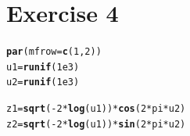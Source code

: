 \documentclass{article}\usepackage[]{graphicx}\usepackage[]{color}
\makeatletter
\newcommand{\hlnum}[1]{\textcolor[rgb]{0.686,0.059,0.569}{#1}}%
\newcommand{\hlopt}[1]{\textcolor[rgb]{0,0,0}{#1}}%
\newcommand{\hlstd}[1]{\textcolor[rgb]{0.345,0.345,0.345}{#1}}%
\newcommand{\hlkwb}[1]{\textcolor[rgb]{0.69,0.353,0.396}{#1}}%
\newcommand{\hlkwc}[1]{\textcolor[rgb]{0.333,0.667,0.333}{#1}}%
\newcommand{\hlkwd}[1]{\textcolor[rgb]{0.737,0.353,0.396}{\textbf{#1}}}%
\newenvironment{kframe}{%
 \def\at@end@of@kframe{}%
 \ifinner\ifhmode%
  \def\at@end@of@kframe{\end{minipage}}%
  \begin{minipage}{\columnwidth}%
 \fi\fi%
 \def\FrameCommand##1{\hskip\@totalleftmargin \hskip-\fboxsep
 \colorbox{shadecolor}{##1}\hskip-\fboxsep
     \hskip-\linewidth \hskip-\@totalleftmargin \hskip\columnwidth}%
 \MakeFramed {\advance\hsize-\width
   \@totalleftmargin\z@ \linewidth\hsize
   \@setminipage}}%
 {\par\unskip\endMakeFramed%
 \at@end@of@kframe}
\newenvironment{knitrout}{}{} %
\makeatother
\begin{document}
\section*{Exercise 4}
\begin{knitrout}
\color{fgcolor}\begin{kframe}
\begin{alltt}
\hlkwd{par}\hlstd{(}\hlkwc{mfrow}\hlstd{=}\hlkwd{c}\hlstd{(}\hlnum{1}\hlstd{,}\hlnum{2}\hlstd{))}
\hlstd{u1} \hlkwb{=} \hlkwd{runif}\hlstd{(}\hlnum{1e3}\hlstd{)}
\hlstd{u2} \hlkwb{=} \hlkwd{runif}\hlstd{(}\hlnum{1e3}\hlstd{)}

\hlstd{z1} \hlkwb{=} \hlkwd{sqrt}\hlstd{(}\hlopt{-}\hlnum{2}\hlopt{*}\hlkwd{log}\hlstd{(u1))}\hlopt{*}\hlkwd{cos}\hlstd{(}\hlnum{2}\hlopt{*}\hlstd{pi}\hlopt{*}\hlstd{u2)}
\hlstd{z2} \hlkwb{=} \hlkwd{sqrt}\hlstd{(}\hlopt{-}\hlnum{2}\hlopt{*}\hlkwd{log}\hlstd{(u1))}\hlopt{*}\hlkwd{sin}\hlstd{(}\hlnum{2}\hlopt{*}\hlstd{pi}\hlopt{*}\hlstd{u2)}



\end{alltt}
\end{kframe}
\end{knitrout}
\end{document}
